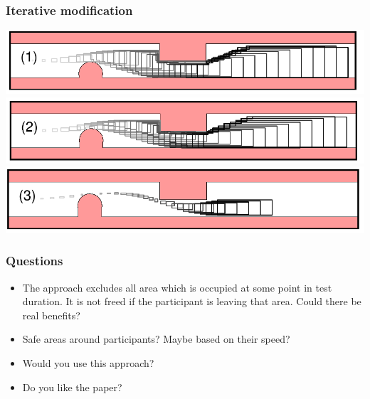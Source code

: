 \documentclass{beamer}
\begin{document}
\begin{frame}
    \frametitle{Iterative modification}
    \includegraphics[width=\textwidth]{drivableArea(1).png}
    \pause{}
    \includegraphics[width=\textwidth]{drivableArea(2).png}
    \pause{}
    \includegraphics[width=\textwidth]{drivableArea(3).png}
\end{frame}

\begin{frame}
    \frametitle{Questions}
    \begin{itemize}
        \item The approach excludes all area which is occupied at some point in test duration.
            It is not freed if the participant is leaving that area.
            Could there be real benefits?
        \item Safe areas around participants? Maybe based on their speed?
        \item Would you use this approach?
        \item Do you like the paper?
    \end{itemize}
\end{frame}
\end{document}
